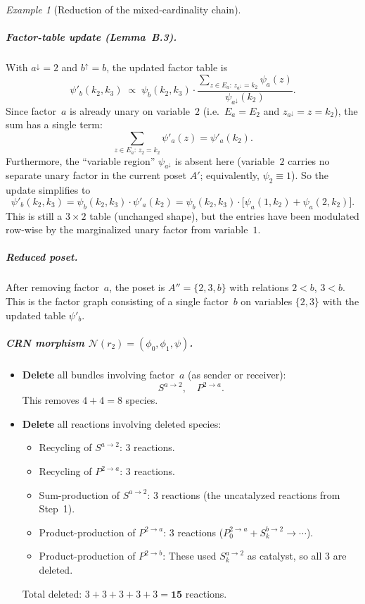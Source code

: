 \documentclass{article}
\theoremstyle{plain}
\theoremstyle{definition}
\theoremstyle{remark}
\newtheorem{example}{Example}[section]
\newcommand{\<}{\langle}
\renewcommand{\>}{\rangle}
\begin{document}
\begin{example}[Reduction of the mixed-cardinality chain]
\subparagraph{Factor-table update (Lemma~B.3).}
With $a^{\downarrow}=2$ and $b^{\uparrow}=b$, the updated factor table is
\[
\psi'_b(k_2,k_3)
\;\propto\;
\psi_b(k_2,k_3)\cdot
\frac{\displaystyle\sum_{z\in E_a:\, z_{a^{\downarrow}}=k_2} \psi_a(z)}
     {\psi_{a^{\downarrow}}(k_2)}.
\]
Since factor~$a$ is already unary on variable~$2$
(i.e.\ $E_a=E_2$ and $z_{a^{\downarrow}}=z=k_2$),
the sum has a single term:
\[
\sum_{z\in E_a:\, z_2=k_2} \psi'_a(z) = \psi'_a(k_2).
\]
Furthermore, the ``variable region'' $\psi_{a^{\downarrow}}$
is absent here (variable~$2$ carries no separate unary factor
in the current poset $A'$; equivalently, $\psi_2\equiv 1$).
So the update simplifies to
\begin{equation}\label{eq:updated-psi-b}
\psi'_b(k_2,k_3) = \psi_b(k_2,k_3)\cdot\psi'_a(k_2)
= \psi_b(k_2,k_3)\cdot\bigl[\psi_a(1,k_2)+\psi_a(2,k_2)\bigr].
\end{equation}
This is still a $3\times 2$ table (unchanged shape), but the
entries have been modulated row-wise by the marginalized
unary factor from variable~$1$.
 
\subparagraph{Reduced poset.}
After removing factor~$a$, the poset is $A''=\{2,3,b\}$ with
relations $2<b$, $3<b$.  This is the factor graph consisting of a
single factor~$b$ on variables $\{2,3\}$ with the updated table
$\psi'_b$.
 
\subparagraph{CRN morphism $\mathcal{N}(r_2)=(\phi_0,\phi_1,\psi)$.}
 
\begin{itemize}
\item[$\phi_0$:] \textbf{Delete} all bundles involving factor~$a$
  (as sender or receiver):
  \[
  S^{a\to 2},\quad P^{2\to a}.
  \]
  This removes $4+4=8$ species.
 
\item[$\phi_1$:] \textbf{Delete} all reactions involving deleted species:
  \begin{itemize}
  \item Recycling of $S^{a\to 2}$: 3 reactions.
  \item Recycling of $P^{2\to a}$: 3 reactions.
  \item Sum-production of $S^{a\to 2}$: 3 reactions
    (the uncatalyzed reactions from Step~1).
  \item Product-production of $P^{2\to a}$: 3 reactions
    ($P^{2\to a}_0 + S^{b\to 2}_k \to \cdots$).
  \item Product-production of $P^{2\to b}$:
    These used $S^{a\to 2}_k$ as catalyst, so all 3 are deleted.
  \end{itemize}
  Total deleted: $3+3+3+3+3=\mathbf{15}$ reactions.
 

\end{itemize}
\end{example}
\end{document}
